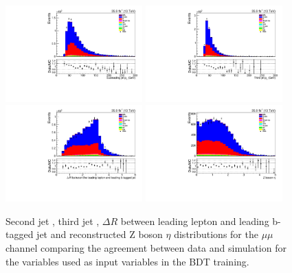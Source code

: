 \begin{figure}[htb]
\centering
\includegraphics[width=0.47\textwidth]{figs/background-estimation/plots/unblinded/prompt_mumu_ttbarInc/secondJetPt_NPL_mumu_wMass_mumu.pdf}
\includegraphics[width=0.47\textwidth]{figs/background-estimation/plots/unblinded/prompt_mumu_ttbarInc/thirdJetPt_NPL_mumu_wMass_mumu.pdf}
\\
\includegraphics[width=0.47\textwidth]{figs/background-estimation/plots/unblinded/prompt_mumu_ttbarInc/zLep1BjetDelR_NPL_mumu_wMass_mumu.pdf}
\includegraphics[width=0.47\textwidth]{figs/background-estimation/plots/unblinded/prompt_mumu_ttbarInc/zPairEta_NPL_mumu_wMass_mumu.pdf}
\caption{
Second jet \pt, third jet \pT, $\Delta R$ between leading lepton and leading b-tagged jet and reconstructed Z boson $\eta$ distributions for the $\mu\mu$ channel comparing the agreement between data and simulation for the variables used as input variables in the BDT training.}
\label{fig:inputFeaturesDataSimAgreement13}
\end{figure}
